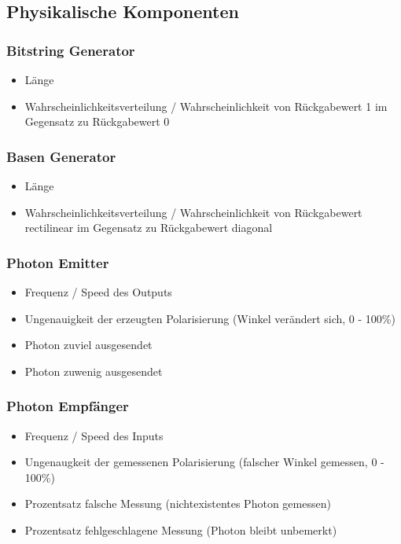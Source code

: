 \documentclass[a4paper,10.2pt,pdftex]{scrartcl}%
\begin{document}
\subsection{Physikalische Komponenten}

\subsubsection*{ Bitstring Generator}
\begin{itemize}
\item Länge
\item  Wahrscheinlichkeitsverteilung / Wahrscheinlichkeit von Rückgabewert 1 im Gegensatz zu Rückgabewert 0
\end{itemize}
\subsubsection*{ Basen Generator}
\begin{itemize}
\item  Länge       
\item  Wahrscheinlichkeitsverteilung / Wahrscheinlichkeit von Rückgabewert rectilinear im Gegensatz zu Rückgabewert diagonal
\end{itemize}

\subsubsection*{ Photon Emitter}
\begin{itemize}
\item Frequenz / Speed des Outputs
\item  Ungenauigkeit der erzeugten Polarisierung (Winkel verändert sich, 0 - 100\%) 
\item  Photon zuviel ausgesendet
\item  Photon zuwenig ausgesendet
\end{itemize}

\subsubsection*{ Photon Empfänger}
\begin{itemize}
\item  Frequenz / Speed des Inputs
\item  Ungenaugkeit der gemessenen Polarisierung (falscher Winkel gemessen, 0 - 100\%) 
\item  Prozentsatz falsche Messung (nichtexistentes Photon gemessen)
\item  Prozentsatz fehlgeschlagene Messung (Photon bleibt unbemerkt)
\end{itemize}
\end{document}

